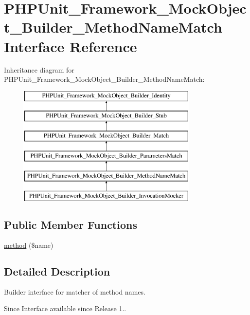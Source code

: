 \hypertarget{interface_p_h_p_unit___framework___mock_object___builder___method_name_match}{}\section{P\+H\+P\+Unit\+\_\+\+Framework\+\_\+\+Mock\+Object\+\_\+\+Builder\+\_\+\+Method\+Name\+Match Interface Reference}
\label{interface_p_h_p_unit___framework___mock_object___builder___method_name_match}
Inheritance diagram for P\+H\+P\+Unit\+\_\+\+Framework\+\_\+\+Mock\+Object\+\_\+\+Builder\+\_\+\+Method\+Name\+Match\+:\begin{figure}[H]
\begin{center}
\leavevmode
\includegraphics[height=6.000000cm]{interface_p_h_p_unit___framework___mock_object___builder___method_name_match}
\end{center}
\end{figure}
\subsection*{Public Member Functions}
\begin{DoxyCompactItemize}
\item 
\mbox{\hyperlink{interface_p_h_p_unit___framework___mock_object___builder___method_name_match_ae552b7982aba3d16ddd35358fc3e8774}{method}} (\$name)
\end{DoxyCompactItemize}


\subsection{Detailed Description}
Builder interface for matcher of method names.

\begin{DoxySince}{Since}
Interface available since Release 1.. 
\end{DoxySince}


